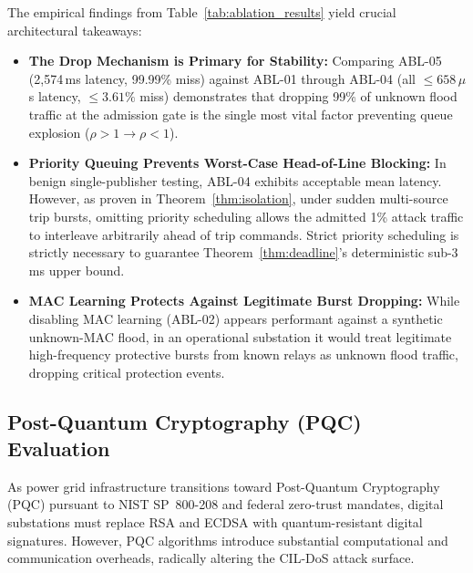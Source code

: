 \documentclass{ieeeaccess}
\begin{document}
The empirical findings from Table~\ref{tab:ablation_results} yield crucial architectural takeaways:
\begin{itemize}[leftmargin=*]
    \item \textbf{The Drop Mechanism is Primary for Stability:} Comparing ABL-05 (2,574\,ms latency, 99.99\% miss) against ABL-01 through ABL-04 (all $\le 658\,\mu$s latency, $\le 3.61\%$ miss) demonstrates that dropping 99\% of unknown flood traffic at the admission gate is the single most vital factor preventing queue explosion ($\rho > 1 \to \rho < 1$).
    \item \textbf{Priority Queuing Prevents Worst-Case Head-of-Line Blocking:} In benign single-publisher testing, ABL-04 exhibits acceptable mean latency. However, as proven in Theorem~\ref{thm:isolation}, under sudden multi-source trip bursts, omitting priority scheduling allows the admitted 1\% attack traffic to interleave arbitrarily ahead of trip commands. Strict priority scheduling is strictly necessary to guarantee Theorem~\ref{thm:deadline}'s deterministic sub-3\,ms upper bound.
    \item \textbf{MAC Learning Protects Against Legitimate Burst Dropping:} While disabling MAC learning (ABL-02) appears performant against a synthetic unknown-MAC flood, in an operational substation it would treat legitimate high-frequency protective bursts from known relays as unknown flood traffic, dropping critical protection events.
\end{itemize}

\subsection{Post-Quantum Cryptography (PQC) Evaluation}
\label{sec:pqc_evaluation}
As power grid infrastructure transitions toward Post-Quantum Cryptography (PQC) pursuant to NIST SP~800-208 and federal zero-trust mandates, digital substations must replace RSA and ECDSA with quantum-resistant digital signatures. However, PQC algorithms introduce substantial computational and communication overheads, radically altering the CIL-DoS attack surface. 
\end{document}
